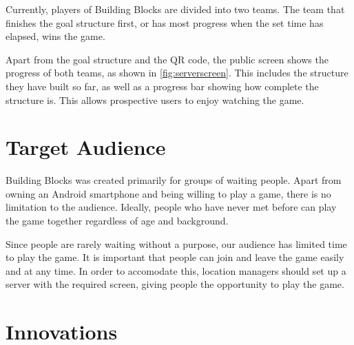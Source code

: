\documentclass{chi-ext}
\begin{document}
Currently, players of Building Blocks are divided into two teams. The team that finishes the goal structure first, or has most progress when the set time has elapsed, wins the game.

Apart from the goal structure and the QR code, the public screen shows the progress of both teams, as shown in \autoref{fig:serverscreen}. This includes the structure they have built so far, as well as a progress bar showing how complete the structure is. This allows prospective users to enjoy watching the game.

\balance
\newpage


\section{Target Audience}

Building Blocks was created primarily for groups of waiting people. Apart from owning an Android smartphone and being willing to play a game, there is no limitation to the audience. Ideally, people who have never met before can play the game together regardless of age and background.

Since people are rarely waiting without a purpose, our audience has limited time to play the game. It is important that people can join and leave the game easily and at any time. In order to accomodate this, location managers should set up a server with the required screen, giving people the opportunity to play the game.


\section{Innovations}

\end{document}
